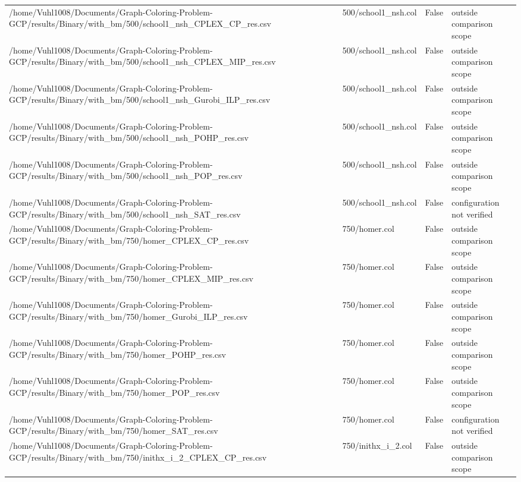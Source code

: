 \begin{table}[htbp]
\begin{tabular}{llll}
/home/Vuhl1008/Documents/Graph-Coloring-Problem-GCP/results/Binary/with\_bm/500/school1\_nsh\_CPLEX\_CP\_res.csv & 500/school1\_nsh.col & False & outside comparison scope \\
/home/Vuhl1008/Documents/Graph-Coloring-Problem-GCP/results/Binary/with\_bm/500/school1\_nsh\_CPLEX\_MIP\_res.csv & 500/school1\_nsh.col & False & outside comparison scope \\
/home/Vuhl1008/Documents/Graph-Coloring-Problem-GCP/results/Binary/with\_bm/500/school1\_nsh\_Gurobi\_ILP\_res.csv & 500/school1\_nsh.col & False & outside comparison scope \\
/home/Vuhl1008/Documents/Graph-Coloring-Problem-GCP/results/Binary/with\_bm/500/school1\_nsh\_POHP\_res.csv & 500/school1\_nsh.col & False & outside comparison scope \\
/home/Vuhl1008/Documents/Graph-Coloring-Problem-GCP/results/Binary/with\_bm/500/school1\_nsh\_POP\_res.csv & 500/school1\_nsh.col & False & outside comparison scope \\
/home/Vuhl1008/Documents/Graph-Coloring-Problem-GCP/results/Binary/with\_bm/500/school1\_nsh\_SAT\_res.csv & 500/school1\_nsh.col & False & configuration not verified \\
/home/Vuhl1008/Documents/Graph-Coloring-Problem-GCP/results/Binary/with\_bm/750/homer\_CPLEX\_CP\_res.csv & 750/homer.col & False & outside comparison scope \\
/home/Vuhl1008/Documents/Graph-Coloring-Problem-GCP/results/Binary/with\_bm/750/homer\_CPLEX\_MIP\_res.csv & 750/homer.col & False & outside comparison scope \\
/home/Vuhl1008/Documents/Graph-Coloring-Problem-GCP/results/Binary/with\_bm/750/homer\_Gurobi\_ILP\_res.csv & 750/homer.col & False & outside comparison scope \\
/home/Vuhl1008/Documents/Graph-Coloring-Problem-GCP/results/Binary/with\_bm/750/homer\_POHP\_res.csv & 750/homer.col & False & outside comparison scope \\
/home/Vuhl1008/Documents/Graph-Coloring-Problem-GCP/results/Binary/with\_bm/750/homer\_POP\_res.csv & 750/homer.col & False & outside comparison scope \\
/home/Vuhl1008/Documents/Graph-Coloring-Problem-GCP/results/Binary/with\_bm/750/homer\_SAT\_res.csv & 750/homer.col & False & configuration not verified \\
/home/Vuhl1008/Documents/Graph-Coloring-Problem-GCP/results/Binary/with\_bm/750/inithx\_i\_2\_CPLEX\_CP\_res.csv & 750/inithx\_i\_2.col & False & outside comparison scope \\

\end{tabular}
\end{table}
